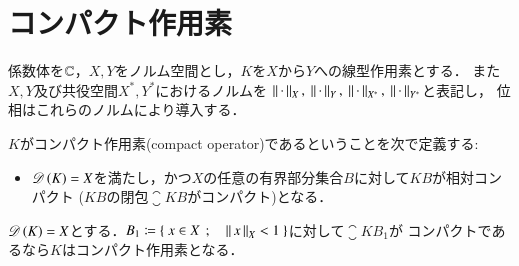 \chapter{コンパクト作用素}
	
	係数体を$\mathbb{C}$，$X,Y$をノルム空間とし，$K$を$X$から$Y$への線型作用素とする．
	また$X,Y$及び共役空間$X^*,Y^*$におけるノルムを
	$\Norm{\cdot}{X},\ \Norm{\cdot}{Y},\ \Norm{\cdot}{X^*},\ \Norm{\cdot}{Y^*}$と表記し，
	位相はこれらのノルムにより導入する．
	
	\begin{screen}
		\begin{dfn}[コンパクト作用素]
			$K$がコンパクト作用素(compact operator)であるということを次で定義する:
			\begin{itemize}
				\item $\Dom{K} = X$を満たし，かつ$X$の任意の有界部分集合$B$に対して$KB$が相対コンパクト
					($KB$の閉包$\closure{KB}$がコンパクト)となる．
			\end{itemize}
		\end{dfn}
	\end{screen}
	
	\begin{screen}
		\begin{lem}[コンパクト作用素となるための十分条件の一つ]
			$\Dom{K} = X$とする．$B_1 \coloneqq \left\{\ x \in X\ \, ; \quad \left\|\, x\, \right\|_{X} < 1\ \right\}$に対して$\closure{KB_1}$が
			コンパクトであるなら$K$はコンパクト作用素となる．
		\end{lem}
	\end{screen}
	
